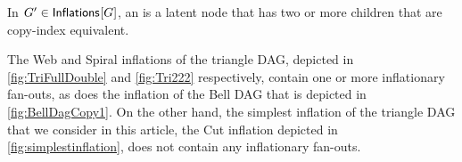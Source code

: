 {%



\begin{definition}
In $G'\in{\operatorname{\mathsf{Inflations}}_{}}\lbrack G\rbrack$, an  is a latent node that has two or more children that are copy-index equivalent.  
\end{definition}

 The Web and Spiral inflations of the triangle DAG, depicted in \cref{fig:TriFullDouble} and \cref{fig:Tri222} respectively,
contain one or more inflationary fan-outs, as does the inflation of the Bell DAG that is depicted in \cref{fig:BellDagCopy1}.  On the other hand, the simplest inflation of the triangle DAG that we consider in this article, the Cut inflation depicted in \cref{fig:simplestinflation}, does not contain any inflationary fan-outs.


}
